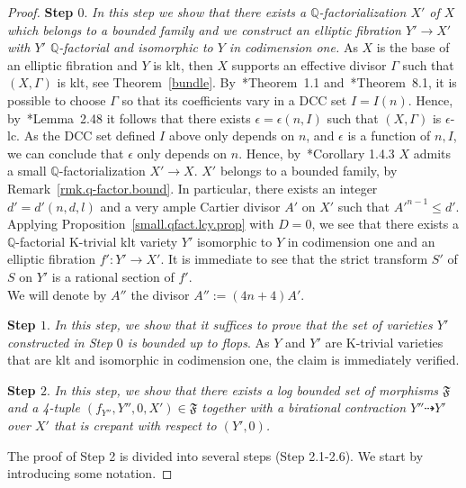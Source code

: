 \documentclass[11pt]{ip-journal}
\theoremstyle{definition}
\begin{document}
\begin{proof}
{\bf Step $0$}. 
{\it In this step we show that there exists a $\mathbb{Q}$-factorialization $X'$ of $X$ which belongs to a bounded family and we construct an elliptic fibration $Y' \to X'$ with $Y'$ $\mathbb{Q}$-factorial and isomorphic to $Y$ in codimension one.}
\newline
As $X$ is the base of an elliptic fibration and $Y$ is klt, then $X$ supports an effective divisor $\Gamma$ such that $(X, \Gamma)$ is klt, see Theorem~\ref{bundle}.
By~\cite{MR3224718}*{Theorem~1.1} and~\cite{MR2448282}*{Theorem~8.1}, it is possible to choose $\Gamma$ so that its coefficients vary in a DCC set $I=I(n)$.
Hence, by~\cite{Bir16a}*{Lemma~2.48} it follows that there exists $\epsilon=\epsilon(n, I)$ such that $(X, \Gamma)$ is $\epsilon$-lc.
As the DCC set defined $I$ above only depends on $n$, and $\epsilon$ is a function of $n, I$, we can conclude that $\epsilon$ only depends on $n$.
\newline
Hence, by~\cite{BCHM}*{Corollary 1.4.3} $X$ admits a small $\mathbb{Q}$-factorialization $X' \to X$. 
$X'$ belongs to a bounded family, by Remark~\ref{rmk.q-factor.bound}.
In particular, there exists an integer $d'=d'(n, d, l)$ and a very ample Cartier divisor $A'$ on $X'$ such that $A'^{n-1} \leq d'$.
Applying Proposition~\ref{small.qfact.lcy.prop} with $D=0$, we see that there exists a $\mathbb{Q}$-factorial K-trivial klt variety $Y'$ isomorphic to $Y$ in codimension one and an elliptic fibration $f' \colon Y' \to X'$.
It is immediate to see that the strict transform $S'$ of $S$ on $Y'$ is a rational section of $f'$.
\\
We will denote by $A''$ the divisor $A'':=(4n+4)A'$. 

\medskip

{\bf Step $1$}. 
{\it In this step, we show that it suffices to prove that the set of varieties
$Y'$ 
constructed in Step 
$0$ 
is bounded up to flops}.
\newline
As 
$Y$ 
and 
$Y'$ 
are K-trivial varieties that are klt and isomorphic in codimension one,
the claim is immediately verified. 

\medskip

{\bf Step $2$}. {\it In this step, we show that there exists a log bounded set of morphisms $\mathfrak F$ and a 4-tuple $(f_{Y''}, Y'', 0, X') \in \mathfrak F$ together with a birational contraction $Y'' \dashrightarrow Y'$ over $X'$ that is crepant with respect to $(Y', 0)$.}

\medskip

The proof of Step 2 is divided into several steps (Step 2.1-2.6).
We start by introducing some notation.


\end{proof}
\end{document}
